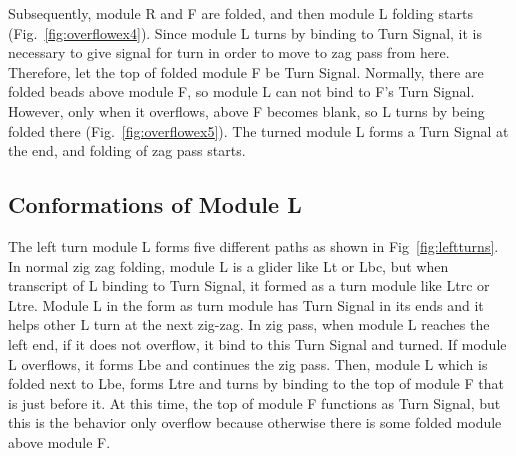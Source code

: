\documentclass[runningheads]{llncs}
\begin{document}
Subsequently, module R and F are folded, and then module L folding starts (Fig.~\ref{fig:overflowex4}).
Since module L turns by binding to Turn Signal, it is necessary to give signal for turn in order to move to zag pass from here.
Therefore, let the top of folded module F be Turn Signal.
Normally, there are folded beads above module F, so module L can not bind to F's Turn Signal.
However, only when it overflows, above F becomes blank, so L turns by being folded there (Fig.~\ref{fig:overflowex5}).
The turned module L forms a Turn Signal at the end, and folding of zag pass starts.


\subsection{Conformations of Module L}
The left turn module L forms five different paths as shown in Fig~\ref{fig:leftturns}.
In normal zig zag folding, module L is a glider like Lt or Lbc, but when transcript of L binding to Turn Signal, it formed as a turn module like Ltrc or Ltre.
Module L in the form as turn module has Turn Signal in its ends and it helps other L turn at the next zig-zag.
In zig pass, when module L reaches the left end, if it does not overflow, it bind to this Turn Signal and turned.
If module L overflows, it forms Lbe and continues the zig pass.
Then, module L which is folded next to Lbe, forms Ltre and turns by binding to the top of module F that is just before it.
At this time, the top of module F functions as Turn Signal, but this is the behavior only overflow because otherwise there is some folded module above module F.
\end{document}
